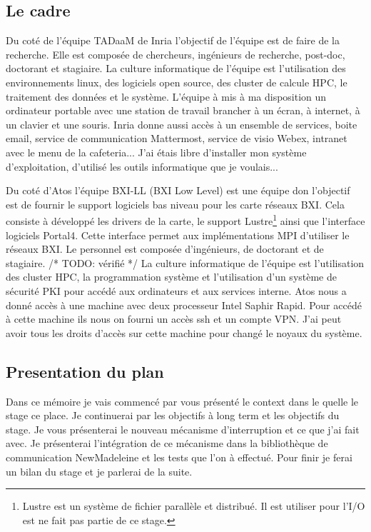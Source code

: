 \subsection{Le cadre}

Du coté de l'équipe TADaaM de Inria l'objectif de l'équipe est de faire de la recherche.
Elle est composée de chercheurs, ingénieurs de recherche, post-doc, doctorant et stagiaire.
La culture informatique de l'équipe est l'utilisation des environnements linux, des logiciels open source,
des cluster de calcule HPC, le traitement des données et le système.
L'équipe à mis à ma disposition un ordinateur portable avec une station de travail brancher à un écran, à internet, à un clavier et une souris.
Inria donne aussi accès à un ensemble de services, boite email, service de communication Mattermost, service de visio Webex, intranet avec le menu de la cafeteria...
J'ai étais libre d'installer mon système d'exploitation, d'utilisé les outils informatique que je voulais...

Du coté d'Atos l'équipe BXI-LL (BXI Low Level) est une équipe don l'objectif est de fournir le support logiciels bas niveau pour les carte réseaux BXI.
Cela consiste à développé les drivers de la carte, le support Lustre\footnote{Lustre est un système de fichier parallèle et distribué. Il est utiliser pour l'I/O est ne fait pas partie de ce stage.} ainsi que l'interface logiciels Portal4.
Cette interface permet aux implémentations MPI d'utiliser le réseaux BXI.
Le personnel est composée d'ingénieurs, de doctorant et de stagiaire. /* TODO: vérifié */
La culture informatique de l'équipe est l'utilisation des cluster HPC, la programmation système et l'utilisation d'un système de sécurité PKI pour accédé aux ordinateurs et aux services interne.
Atos nous a donné accès à une machine avec deux processeur Intel Saphir Rapid.
Pour accédé à cette machine ils nous on fourni un accès ssh et un compte VPN.
J'ai peut avoir tous les droits d'accès sur cette machine pour changé le noyaux du système.

\subsection{Presentation du plan}

Dans ce mémoire je vais commencé par vous présenté le context dans le quelle le stage ce place.
Je continuerai par les objectifs à long term et les objectifs du stage.
Je vous présenterai le nouveau mécanisme d'interruption et ce que j'ai fait avec.
Je présenterai l'intégration de ce mécanisme dans la bibliothèque de communication NewMadeleine et les tests que l'on à effectué.
Pour finir je ferai un bilan du stage et je parlerai de la suite.
